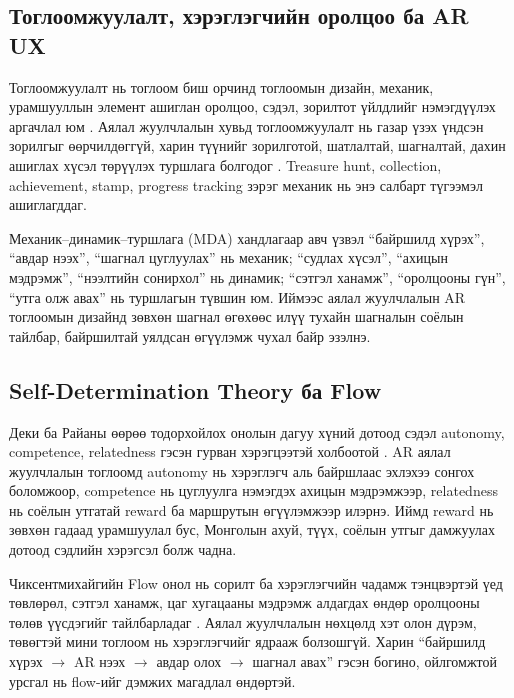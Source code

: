 \begin{sloppy}
\section{Тоглоомжуулалт, хэрэглэгчийн оролцоо ба AR UX}

Тоглоомжуулалт нь тоглоом биш орчинд тоглоомын дизайн, механик, урамшууллын элемент ашиглан оролцоо, сэдэл, зорилтот үйлдлийг нэмэгдүүлэх аргачлал юм \cite{Deterding2011Gamification,Hamari2014}. Аялал жуулчлалын хувьд тоглоомжуулалт нь газар үзэх үндсэн зорилгыг өөрчилдөггүй, харин түүнийг зорилготой, шатлалтай, шагналтай, дахин ашиглах хүсэл төрүүлэх туршлага болгодог \cite{Xu2017GamificationTourism}. Treasure hunt, collection, achievement, stamp, progress tracking зэрэг механик нь энэ салбарт түгээмэл ашиглагддаг.

Механик--динамик--туршлага (MDA) хандлагаар авч үзвэл ``байршилд хүрэх'', ``авдар нээх'', ``шагнал цуглуулах'' нь механик; ``судлах хүсэл'', ``ахицын мэдрэмж'', ``нээлтийн сонирхол'' нь динамик; ``сэтгэл ханамж'', ``оролцооны гүн'', ``утга олж авах'' нь туршлагын түвшин юм. Иймээс аялал жуулчлалын AR тоглоомын дизайнд зөвхөн шагнал өгөхөөс илүү тухайн шагналын соёлын тайлбар, байршилтай уялдсан өгүүлэмж чухал байр эзэлнэ.

\subsection{Self-Determination Theory ба Flow}

Деки ба Райаны өөрөө тодорхойлох онолын дагуу хүний дотоод сэдэл autonomy, competence, relatedness гэсэн гурван хэрэгцээтэй холбоотой \cite{Deci1985,Ryan2000}. AR аялал жуулчлалын тоглоомд autonomy нь хэрэглэгч аль байршлаас эхлэхээ сонгох боломжоор, competence нь цуглуулга нэмэгдэх ахицын мэдрэмжээр, relatedness нь соёлын утгатай reward ба маршрутын өгүүлэмжээр илэрнэ. Иймд reward нь зөвхөн гадаад урамшуулал бус, Монголын ахуй, түүх, соёлын утгыг дамжуулах дотоод сэдлийн хэрэгсэл болж чадна.

Чиксентмихайгийн Flow онол нь сорилт ба хэрэглэгчийн чадамж тэнцвэртэй үед төвлөрөл, сэтгэл ханамж, цаг хугацааны мэдрэмж алдагдах өндөр оролцооны төлөв үүсдэгийг тайлбарладаг \cite{Csikszentmihalyi1990}. Аялал жуулчлалын нөхцөлд хэт олон дүрэм, төвөгтэй мини тоглоом нь хэрэглэгчийг ядрааж болзошгүй. Харин ``байршилд хүрэх $\rightarrow$ AR нээх $\rightarrow$ авдар олох $\rightarrow$ шагнал авах'' гэсэн богино, ойлгомжтой урсгал нь flow-ийг дэмжих магадлал өндөртэй.


\end{sloppy}
